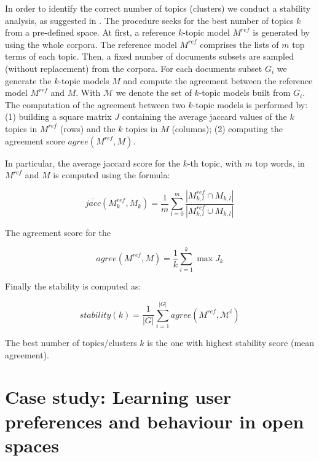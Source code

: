 In order to identify the correct number of topics (clusters) we conduct  a stability analysis, as suggested in \cite{topicmodeeling:greene2014}.
The procedure seeks for the best number of topics $k$ from a pre-defined space. At first, a reference $k$-topic model $M^{ref}$ is generated by using the whole corpora.  The reference model $M^{ref}$ comprises the lists of $m$ top terms of each topic. Then, a fixed number of documents subsets are sampled (without replacement) from the corpora. 
For each documents subset $G_i$ we generate the $k$-topic models $M$ and compute the agreement between the reference model $M^{ref}$ and $M$. With $\mathcal{M}$ we denote the set of $k$-topic models built from $G_i$. The computation of the agreement between two $k$-topic models is performed by: (1) building a square matrix $J$ containing the average jaccard values of the $k$ topics in $M^{ref}$ (rows) and the $k$ topics in $M$ (columns); (2) computing the agreement score $agree(M^{ref},M)$.

In particular, the average jaccard score for the $k$-th topic, with $m$ top words, in $M^{ref}$ and $M$ is computed using the formula:

$$\overline{jacc}(M^{ref}_{k}, M_{k}) = \frac{1}{m} \sum_{l=0}^{m} \frac{|M^{ref}_{k,l} \cap M_{k,l}|}{|M^{ref}_{k,l} \cup M_{k,l}|}$$

The agreement score for the 

$$agree(M^{ref},M)=\frac{1}{k} \sum_{i=1}^{k} \max{J_k}$$

Finally the stability is computed as:

$$stability(k) = \frac{1}{|G|} \sum_{i=1}^{|G|}agree(M^{ref},\mathcal{M}^i)$$

The best number of topics/clusters $k$ is the one with highest stability score (mean agreement).

\section{Case study: Learning user preferences and behaviour in open spaces}

